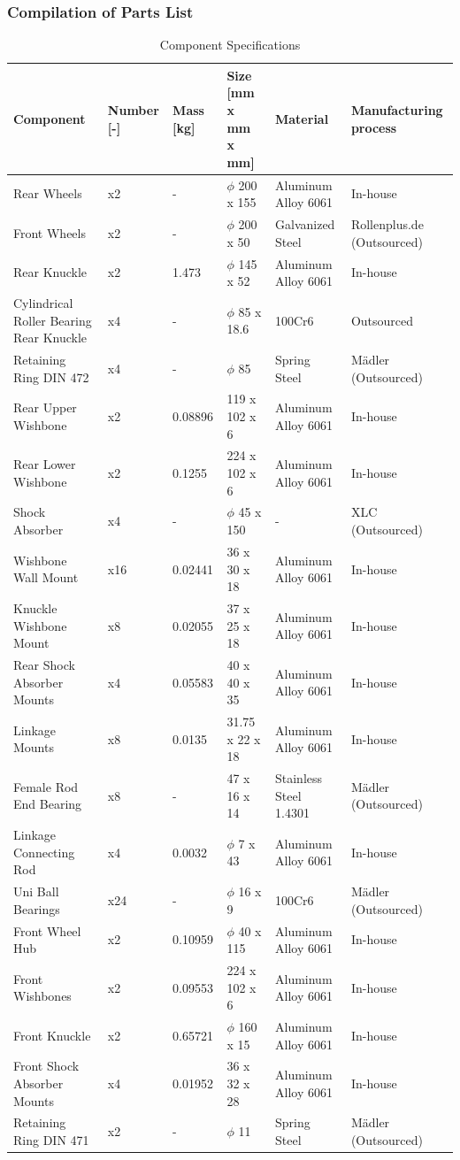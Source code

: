 \subsubsection{Compilation of Parts List}
\begin{table}[H]
\centering
\caption{Component Specifications}
\begin{tabular}{|l|l|l|l|l|l|}
\hline
\textbf{Component} & \textbf{Number [-]} & \textbf{Mass [kg]} & \textbf{Size [mm x mm x mm]} & \textbf{Material} & \textbf{Manufacturing process} \\ \hline
Rear Wheels & x2 & - & $\phi$ 200 x 155 & Aluminum Alloy 6061 & In-house \\ \hline
Front Wheels & x2 & - & $\phi$ 200 x 50 & Galvanized Steel & Rollenplus.de (Outsourced) \\ \hline
Rear Knuckle & x2 & 1.473 & $\phi$ 145 x 52 & Aluminum Alloy 6061 & In-house \\ \hline
Cylindrical Roller Bearing Rear Knuckle & x4 & - & $\phi$ 85 x 18.6 & 100Cr6 & Outsourced \\ \hline
Retaining Ring DIN 472 & x4 & - & $\phi$ 85 & Spring Steel & Mädler (Outsourced) \\ \hline
Rear Upper Wishbone & x2 & 0.08896 & 119 x 102 x 6 & Aluminum Alloy 6061 & In-house \\ \hline
Rear Lower Wishbone & x2 & 0.1255 & 224 x 102 x 6 & Aluminum Alloy 6061 & In-house \\ \hline
Shock Absorber & x4 & - & $\phi$ 45 x 150 & - & XLC (Outsourced) \\ \hline
Wishbone Wall Mount & x16 & 0.02441 & 36 x 30 x 18 & Aluminum Alloy 6061 & In-house \\ \hline
Knuckle Wishbone Mount & x8 & 0.02055 & 37 x 25 x 18 & Aluminum Alloy 6061 & In-house \\ \hline
Rear Shock Absorber Mounts & x4 & 0.05583 & 40 x 40 x 35 & Aluminum Alloy 6061 & In-house \\ \hline
Linkage Mounts & x8 & 0.0135 & 31.75 x 22 x 18 & Aluminum Alloy 6061 & In-house \\ \hline
Female Rod End Bearing & x8 & - & 47 x 16 x 14 & Stainless Steel 1.4301 & Mädler (Outsourced) \\ \hline
Linkage Connecting Rod & x4 & 0.0032 & $\phi$ 7 x 43 & Aluminum Alloy 6061 & In-house \\ \hline
Uni Ball Bearings & x24 & - & $\phi$ 16 x 9 & 100Cr6 & Mädler (Outsourced) \\ \hline
Front Wheel Hub & x2 & 0.10959 & $\phi$ 40 x 115 & Aluminum Alloy 6061 & In-house \\ \hline
Front Wishbones & x2 & 0.09553 & 224 x 102 x 6 & Aluminum Alloy 6061 & In-house \\ \hline
Front Knuckle & x2 & 0.65721 & $\phi$ 160 x 15 & Aluminum Alloy 6061 & In-house \\ \hline
Front Shock Absorber Mounts & x4 & 0.01952 & 36 x 32 x 28 & Aluminum Alloy 6061 & In-house \\ \hline
Retaining Ring DIN 471 & x2 & - & $\phi$ 11 & Spring Steel & Mädler (Outsourced) \\ \hline
\end{tabular}
\end{table}

